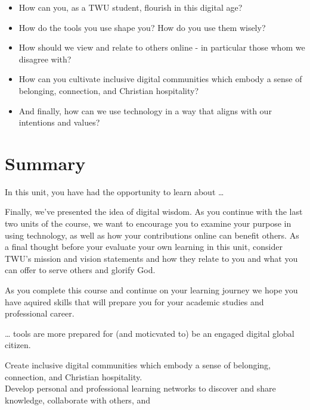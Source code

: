 \documentclass[
]{book}
\providecommand{\tightlist}{%
  \setlength{\itemsep}{0pt}\setlength{\parskip}{0pt}}
\theoremstyle{definition}
\theoremstyle{definition}
\theoremstyle{definition}
\theoremstyle{definition}
\theoremstyle{remark}
\begin{document}
\begin{reflect}
\begin{itemize}
\tightlist
\item
  How can you, as a TWU student, flourish in this digital age?\\
\item
  How do the tools you use shape you? How do you use them wisely?\\
\item
  How should we view and relate to others online - in particular those whom we disagree with?\\
\item
  How can you cultivate inclusive digital communities which embody a sense of belonging, connection, and Christian hospitality?\\
\item
  And finally, how can we use technology in a way that aligns with our intentions and values?
\end{itemize}
\end{reflect}

\hypertarget{summary-5}{%
\section*{Summary}\label{summary-5}}

In this unit, you have had the opportunity to learn about \ldots{}

Finally, we've presented the idea of digital wisdom. As you continue with the last two units of the course, we want to encourage you to examine your purpose in using technology, as well as how your contributions online can benefit others. As a final thought before your evaluate your own learning in this unit, consider TWU's mission and vision statements and how they relate to you and what you can offer to serve others and glorify God.

As you complete this course and continue on your learning journey we hope you have aquired skills that will prepare you for your academic studies and professional career.

\ldots{} tools are more prepared for (and moticvated to) be an engaged digital global citizen.

Create inclusive digital communities which embody a sense of belonging, connection, and Christian hospitality.\\
Develop personal and professional learning networks to discover and share knowledge, collaborate with others, and
\end{document}
